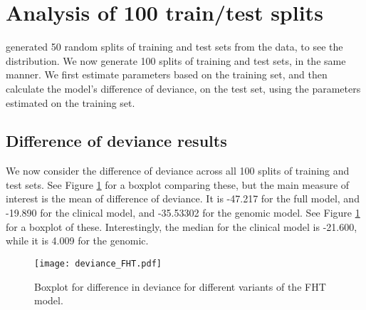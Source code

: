 

\section{Analysis of 100 train/test splits}
\citet{bovelstad2009} generated 50 random splits of training and test sets from the data, to see the distribution.
We now generate 100 splits of training and test sets, in the same manner.
We first estimate parameters based on the training set, and then calculate the model's difference of deviance, on the test set, using the parameters estimated on the training set.

\subsection{Difference of deviance results}
We now consider the difference of deviance across all 100 splits of training and test sets.
See Figure \ref{fig:neuroblastoma-deviances} for a boxplot comparing these, but the main measure of interest is the mean of difference of deviance.
It is -47.217 for the full model, and -19.890 for the clinical model, and -35.53302 for the genomic model.
See Figure \ref{fig:neuroblastoma-deviances} for a boxplot of these.
Interestingly, the median for the clinical model is -21.600, while it is 4.009 for the genomic.


\begin{figure}
\caption{Boxplot for difference in deviance for different variants of the FHT model.}
\label{fig:neuroblastoma-deviances}
\centering
\texttt{[image: deviance\_FHT.pdf]}
\end{figure}


